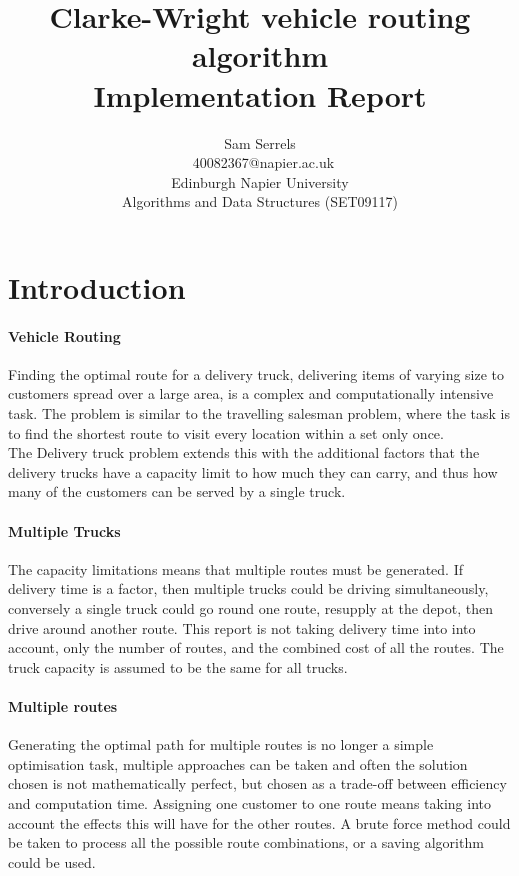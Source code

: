 \documentclass[conference]{acmsiggraph}
\title{Clarke-Wright vehicle routing algorithm\\
	   Implementation Report}
\author{Sam Serrels\\\ 40082367@napier.ac.uk \\
Edinburgh Napier University\\
Algorithms and Data Structures (SET09117)}
\begin{document}
\maketitle

\section{Introduction}

\paragraph{Vehicle Routing}
Finding the optimal route for a delivery truck, delivering items of varying size to customers spread over a large area, is a complex and computationally intensive task.
The problem is similar to the travelling salesman problem, where the task is to find the shortest route to visit every location within a set only once.\\
The Delivery truck problem extends this with the additional factors that the delivery trucks have a capacity limit to how much they can carry, and thus how many of the customers can be served by a single truck. 

\paragraph{Multiple Trucks}
The capacity limitations means that multiple routes must be generated. If delivery time is a factor, then multiple trucks could be driving simultaneously, conversely a single truck could go round one route, resupply at the depot, then drive around another route. This report is not taking delivery time into into account, only the number of routes, and the combined cost of all the routes. The truck capacity is assumed to be the same for all trucks.

\paragraph{Multiple routes}
Generating the optimal path for multiple routes is no longer a simple optimisation task, multiple approaches can be taken and often the solution chosen is not mathematically perfect, but chosen as a trade-off between efficiency and computation time. Assigning one customer to one route means taking into account the effects this will have for the other routes. A brute force method could be taken to process all the possible route combinations, or a saving algorithm could be used.
\end{document}

